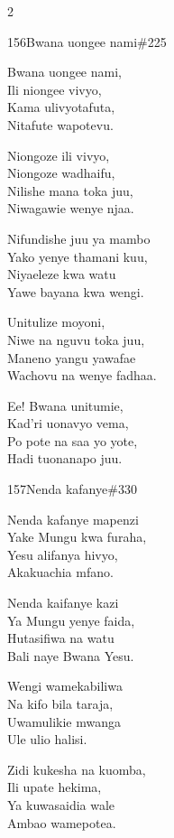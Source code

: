 \documentclass{article}
\begin{document}
\begin{multicols}{2}
\begin{hymn}{156}{Bwana uongee nami}{\#225}
\begin{stanza}
Bwana uongee nami,\\
Ili niongee vivyo,\\
Kama ulivyotafuta,\\
Nitafute wapotevu.
\end{stanza}
\begin{stanza}
Niongoze ili vivyo,\\
Niongoze wadhaifu,\\
Nilishe mana toka juu,\\
Niwagawie wenye njaa.
\end{stanza}
\begin{stanza}
Nifundishe juu ya mambo\\
Yako yenye thamani kuu,\\
Niyaeleze kwa watu\\
Yawe bayana kwa wengi.
\end{stanza}
\begin{stanza}
Unitulize moyoni,\\
Niwe na nguvu toka juu,\\
Maneno yangu yawafae\\
Wachovu na wenye fadhaa.
\end{stanza}
\begin{stanza}
Ee! Bwana unitumie,\\
Kad'ri uonavyo vema,\\
Po pote na saa yo yote,\\
Hadi tuonanapo juu.
\end{stanza}
\end{hymn}

\begin{hymn}{157}{Nenda kafanye}{\#330}
\begin{stanza}
Nenda kafanye mapenzi\\
Yake Mungu kwa furaha,\\
Yesu alifanya hivyo,\\
Akakuachia mfano.
\end{stanza}
\begin{stanza}
Nenda kaifanye kazi\\
Ya Mungu yenye faida,\\
Hutasifiwa na watu\\
Bali naye Bwana Yesu.
\end{stanza}
\begin{stanza}
Wengi wamekabiliwa\\
Na kifo bila taraja,\\
Uwamulikie mwanga\\
Ule ulio halisi.
\end{stanza}
\begin{stanza}
Zidi kukesha na kuomba,\\
Ili upate hekima,\\
Ya kuwasaidia wale\\
Ambao wamepotea.
\end{stanza}
\end{hymn}


\end{multicols}
\end{document}
